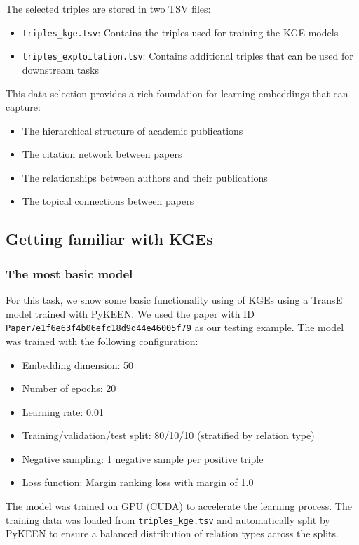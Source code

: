 \documentclass[10pt,a4paper]{article}
\begin{document}
The selected triples are stored in two TSV files:
\begin{itemize}
    \item \texttt{triples\_kge.tsv}: Contains the triples used for training the KGE models
    \item \texttt{triples\_exploitation.tsv}: Contains additional triples that can be used for downstream tasks
\end{itemize}

This data selection provides a rich foundation for learning embeddings that can capture:
\begin{itemize}
    \item The hierarchical structure of academic publications
    \item The citation network between papers
    \item The relationships between authors and their publications
    \item The topical connections between papers
\end{itemize}

\subsection{Getting familiar with KGEs}

\subsubsection{The most basic model}

For this task, we show some basic functionality using of KGEs using a TransE model trained with PyKEEN. We used the paper with ID \texttt{Paper7e1f6e63f4b06efc18d9d44e46005f79} as our testing example. The model was trained with the following configuration:
\begin{itemize}
    \item Embedding dimension: 50
    \item Number of epochs: 20
    \item Learning rate: 0.01
    \item Training/validation/test split: 80/10/10 (stratified by relation type)
    \item Negative sampling: 1 negative sample per positive triple
    \item Loss function: Margin ranking loss with margin of 1.0
\end{itemize}

The model was trained on GPU (CUDA) to accelerate the learning process. The training data was loaded from \texttt{triples\_kge.tsv} and automatically split by PyKEEN to ensure a balanced distribution of relation types across the splits.
\end{document}
